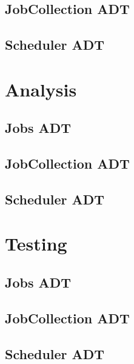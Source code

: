 \documentclass[12pt,a4paper]{article}
\begin{document}
		\subsection{JobCollection ADT}
		\subsection{Scheduler ADT}
	
	\section{Analysis}
		\subsection{Jobs ADT}
		\subsection{JobCollection ADT}
		\subsection{Scheduler ADT}

	\section{Testing}
		\subsection{Jobs ADT}
		\subsection{JobCollection ADT}
		\subsection{Scheduler ADT}
\end{document}
